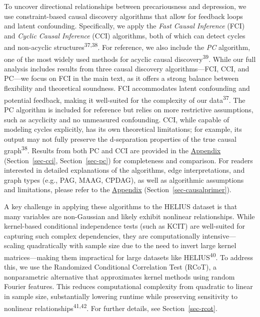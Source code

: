\documentclass[
]{article}
\begin{document}
To uncover directional relationships between precariousness and
depression, we use constraint-based causal discovery algorithms that
allow for feedback loops and latent confounding. Specifically, we apply
the \emph{Fast Causal Inference} (FCI) and \emph{Cyclic Causal
Inference} (CCI) algorithms, both of which can detect cycles and
non-acyclic structures\textsuperscript{37,38}. For reference, we also
include the \emph{PC} algorithm, one of the most widely used methods for
acyclic causal discovery\textsuperscript{39}. While our full analysis
includes results from three causal discovery algorithms---FCI, CCI, and
PC---we focus on FCI in the main text, as it offers a strong balance
between flexibility and theoretical soundness. FCI accommodates latent
confounding and potential feedback, making it well-suited for the
complexity of our data\textsuperscript{37}. The PC algorithm is included
for reference but relies on more restrictive assumptions, such as
acyclicity and no unmeasured confounding. CCI, while capable of modeling
cycles explicitly, has its own theoretical limitations; for example, its
output may not fully preserve the d-separation properties of the true
causal graph\textsuperscript{38}. Results from both PC and CCI are
provided in the \hyperref[sec-appendix]{Appendix}
(Section~\ref{sec-cci}, Section~\ref{sec-pc}) for completeness and
comparison. For readers interested in detailed explanations of the
algorithms, edge interpretations, and graph types (e.g., PAG, MAAG,
CPDAG), as well as algorithmic assumptions and limitations, please refer
to the \hyperref[sec-appendix]{Appendix}
(Section~\ref{sec-causalprimer}).

A key challenge in applying these algorithms to the HELIUS dataset is
that many variables are non-Gaussian and likely exhibit nonlinear
relationships. While kernel-based conditional independence tests (such
as KCIT) are well-suited for capturing such complex dependencies, they
are computationally intensive---scaling quadratically with sample size
due to the need to invert large kernel matrices---making them
impractical for large datasets like HELIUS\textsuperscript{40}. To
address this, we use the Randomized Conditional Correlation Test (RCoT),
a nonparametric alternative that approximates kernel methods using
random Fourier features. This reduces computational complexity from
quadratic to linear in sample size, substantially lowering runtime while
preserving sensitivity to nonlinear
relationships\textsuperscript{41,42}. For further details, see
Section~\ref{sec-rcot}.
\end{document}
